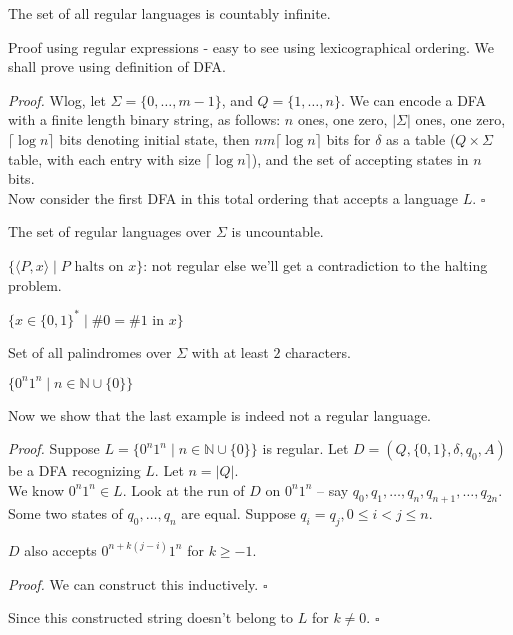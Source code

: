 \documentclass[a4paper]{article}
\newenvironment{proof}{\begin{breakbox}\textit{Proof.}}{\hfill$\square$\end{breakbox}}
\newcommand{\nl}{\vspace{0.2cm}\\}
\newcommand{\mb}{\mathbb}
\begin{document}
\begin{claim}
    The set of all regular languages is countably infinite.
\end{claim}
\begin{note}
    Proof using regular expressions - easy to see using lexicographical ordering. We shall prove using definition of DFA.
\end{note}
\begin{proof}
    Wlog, let $\Sigma = \{0, \ldots, m - 1\}$, and $Q = \{1, \ldots, n\}$.
    We can encode a DFA with a finite length binary string, as follows:
    $n$ ones, one zero, $|\Sigma|$ ones, one zero, $\lceil\log n\rceil$ bits denoting initial state, then $n m \lceil \log n \rceil$ bits for $\delta$ as a table ($Q \times \Sigma$ table, with
    each entry with size $\lceil \log n \rceil$), and the set of accepting states in $n$
    bits.\nl
    Now consider the first DFA in this total ordering that accepts a language $L$.
\end{proof}

\begin{cor}
    The set of regular languages over $\Sigma$ is uncountable.
\end{cor}

\begin{eg}
    $\{\langle P, x \rangle \mid P \text{ halts on } x\}$: not regular else we'll get a contradiction to the halting problem.
\end{eg}

\begin{eg}
    $\{x \in \{0,1\}^* \mid \# 0 = \# 1 \text{ in } x\}$
\end{eg}

\begin{eg}
    Set of all palindromes over $\Sigma$ with at least $2$ characters.
\end{eg}

\begin{eg}
    $\{0^n 1^n \mid n \in \mb{N} \cup \{0\}\}$
\end{eg}

Now we show that the last example is indeed not a regular language.

\begin{proof}
    Suppose $L = \{0^n 1^n \mid n \in \mb{N} \cup \{0\}\}$ is regular. Let $D = (Q, \{0, 1\}, \delta, q_0, A)$ be a DFA recognizing $L$. Let $n = |Q|$.\nl
    We know $0^n 1^n \in L$. Look at the run of $D$ on $0^n 1^n$ -- say $q_0, q_1, \ldots, q_n, q_{n+1}, \ldots, q_{2n}$.\nl
    Some two states of $q_0, \ldots, q_n$ are equal. Suppose $q_i = q_j, 0 \le i < j \le n$.\nl
    \begin{claim}
        $D$ also accepts $0^{n+k(j-i)} 1^n$ for $k \ge -1$.
    \end{claim}
    \begin{proof}
        We can construct this inductively.
    \end{proof}
    Since this constructed string doesn't belong to $L$ for $k \ne 0$.
\end{proof}
\end{document}
